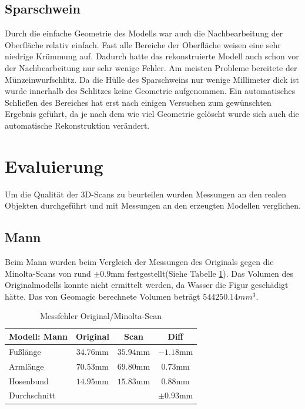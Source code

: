 \documentclass[]{article}
\begin{document}
\subsection{Sparschwein}
Durch die einfache Geometrie des Modells war auch die Nachbearbeitung der Oberfläche relativ einfach. Fast alle Bereiche der Oberfläche weisen eine sehr niedrige Krümmung auf. Dadurch hatte das rekonstruierte Modell auch schon vor der Nachbearbeitung nur sehr wenige Fehler. Am meisten Probleme bereitete der Münzeinwurfschlitz. Da die Hülle des Sparschweins nur wenige Millimeter dick ist wurde innerhalb des Schlitzes keine Geometrie aufgenommen. Ein automatisches Schließen des Bereiches hat erst nach einigen Versuchen zum gewünschten Ergebnis geführt, da je nach dem wie viel Geometrie gelöscht wurde sich auch die automatische Rekonstruktion verändert. 

\section{Evaluierung}
Um die Qualität der 3D-Scans zu beurteilen wurden Messungen an den realen Objekten durchgeführt und mit Messungen an den erzeugten Modellen verglichen.

\subsection{}
\subsection{Mann}
Beim Mann wurden beim Vergleich der Messungen des Originals gegen die Minolta-Scans von rund $\pm 0.9$mm festgestellt(Siehe Tabelle \ref{tab:man:errorScan}). Das Volumen des Originalmodells konnte nicht ermittelt werden, da Wasser die Figur geschädigt hätte. Das von Geomagic berechnete Volumen beträgt $544250.14mm^3$.

\begin{table}[h!]
\centering
\begin{tabular}{l | c c | c}
Modell: Mann& Original & Scan & Diff\\
\hline
Fußlänge & $34.76$mm & $35.94$mm & $-1.18$mm\\
Armlänge & $70.53$mm & $69.80$mm & $0.73$mm\\
Hosenbund & $14.95$mm & $15.83$mm & $0.88$mm\\
\hline \hline
Durchschnitt & & & $\pm 0.93$mm
\end{tabular}
\caption{Messfehler Original/Minolta-Scan}
\label{tab:man:errorScan}
\end{table}
\end{document}
